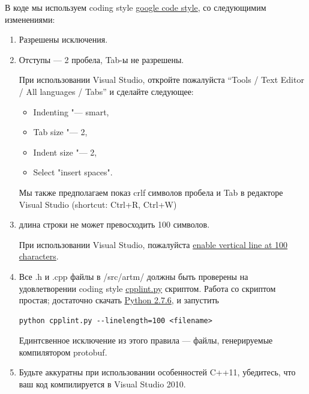 \documentclass[12pt]{article}
\begin{document}
В коде мы используем coding style
\href{http://google-styleguide.googlecode.com/svn/trunk/cppguide.xml}{google code style},
со следующимим изменениями:
\begin{enumerate}
    \item Разрешены исключения.
    \item Отступы --- 2 пробела, Tab-ы не разрешены.

      При использовании Visual Studio,
      откройте пожалуйста ``Tools / Text Editor / All languages / Tabs''
      и сделайте следующее:
      \begin{itemize}
          \item Indenting "--- smart,
          \item Tab size "--- 2,
          \item Indent size "--- 2,
          \item Select "insert spaces".
      \end{itemize}

      Мы также предполагаем показ crlf символов пробела и Tab
      в редакторе Visual Studio (shortcut: Ctrl+R, Ctrl+W)

\item длина строки не может превосходить 100 символов.

      При использовании Visual Studio, пожалуйста \href{http://stackoverflow.com/questions/9894397/100-characters-line-marker-in-visual-studio}{enable
       vertical line at 100 characters}.

\item Все .h и .cpp файлы в /src/artm/ должны быть проверены на удовлетворении coding style 
      \href{http://google-styleguide.googlecode.com/svn/trunk/cpplint/cpplint.py}{cpplint.py} скриптом.
      Работа со скриптом простая; достаточно скачать
      \href{http://www.python.org/downloads/}{Python 2.7.6}, и запустить 

\begin{verbatim}
python cpplint.py --linelength=100 <filename>
\end{verbatim}
      Единтсвенное исключение из этого правила --- файлы, генерируемые компилятором protobuf.
      
\item Будьте аккуратны при использовании особенностей C++11, убедитесь, что ваш код компилируется в Visual Studio 2010.

\end{enumerate}
\end{document}
